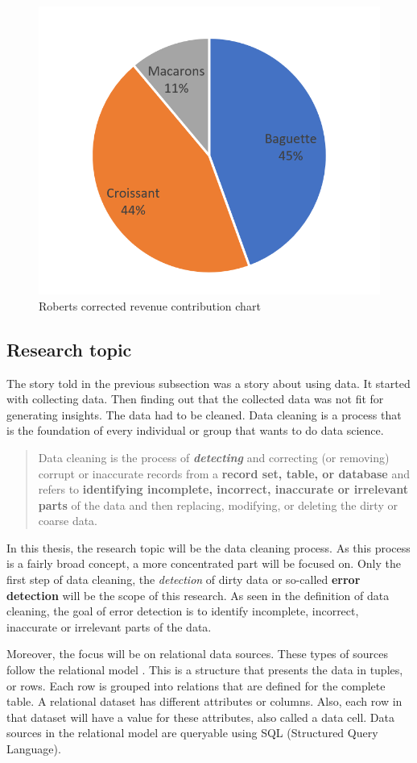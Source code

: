 \begin{figure}[H]
    \centering
    \includegraphics[width=0.5\linewidth]{thesis/Figures/Sales_Pie_Clean.png}
    \caption{Roberts corrected revenue contribution chart}
    \label{fig:sales_pie_clean}
\end{figure}

\subsection{Research topic}
The story told in the previous subsection was a story about using data. It started with collecting data. Then finding out that the collected data was not fit for generating insights. The data had to be cleaned. Data cleaning is a process that is the foundation of every individual or group that wants to do data science.

\blockquote{Data cleaning is the process of \textbf{\textit{detecting}} and correcting (or removing) corrupt or inaccurate records from a \textbf{record set, table, or database} and refers to \textbf{identifying incomplete, incorrect, inaccurate or irrelevant parts} of the data and then replacing, modifying, or deleting the dirty or coarse data.}

In this thesis, the research topic will be the data cleaning process. As this process is a fairly broad concept, a more concentrated part will be focused on. Only the first step of data cleaning, the \textit{detection} of dirty data or so-called \textbf{error detection} will be the scope of this research.
As seen in the definition of data cleaning, the goal of error detection is to identify incomplete, incorrect, inaccurate or irrelevant parts of the data. 

Moreover, the focus will be on relational data sources. These types of sources follow the relational model \cite{Codd1970-vj}. This is a structure that presents the data in tuples, or rows. Each row is grouped into relations that are defined for the complete table. A relational dataset has different attributes or columns. Also, each row in that dataset will have a value for these attributes, also called a data cell. Data sources in the relational model are queryable using SQL (Structured Query Language). 

